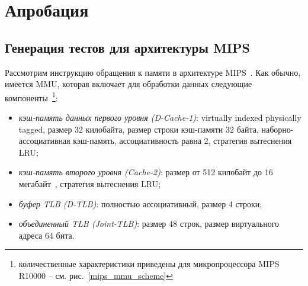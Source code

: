 \documentclass[14pt]{extreport}
\newtheorem{utv}{Утверждение}
\newcommand{\LRU}{\textsf{LRU}\xspace}
\begin{document}

\chapter{Апробация}

\section{Генерация тестов для архитектуры MIPS}


Рассмотрим инструкцию обращения к памяти в архитектуре MIPS~\cite{mips64_III}. Как обычно, имеется MMU, которая включает для обработки данных следующие компоненты~\footnote{количественные характеристики приведены для микропроцессора MIPS R10000 -- см. рис.~\ref{mips_mmu_scheme}}:
\begin{itemize}
  \item \emph{кэш-память данных первого уровня (D-Cache-1)}:  virtually indexed physically tagged, размер 32 килобайта, размер строки кэш-памяти 32 байта, наборно-ассоциативная кэш-память, ассоциативность равна 2, стратегия вытеснения \LRU;
  \item \emph{кэш-память второго уровня (Cache-2)}: размер от 512 килобайт до 16 мегабайт~\cite{shnitman}, стратегия вытеснения LRU;
  \item \emph{буфер TLB (D-TLB)}: полностью ассоциативный, размер 4 строки;
  \item \emph{объединенный TLB (Joint-TLB)}: размер 48 строк, размер виртуального адреса 64 бита.
\end{itemize}
\end{document}
